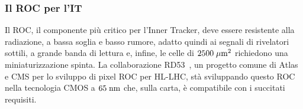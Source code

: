 
\subsubsection{Il ROC per l'IT}
\label{IntroROCIT}

Il ROC, il componente pi\`u critico per l'Inner Tracker, deve essere resistente alla radiazione, a bassa soglia e basso rumore, adatto quindi ai segnali di rivelatori sottili, a grande banda di lettura e, infine, le celle di $2500 \; \mu \rm m^2$ richiedono una miniaturizzazione spinta. La collaborazione RD53~\cite{RD53}, un progetto comune di Atlas e CMS per lo sviluppo di pixel ROC per HL-LHC, st\`a sviluppando questo ROC nella tecnologia CMOS a $65\rm \; nm$ che, sulla carta, \`e compatibile con i succitati requisiti.

